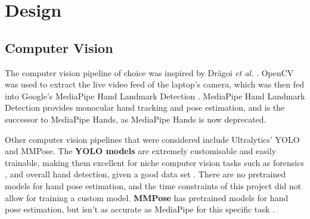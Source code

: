 





\chapter{Design}

\section{Computer Vision}
The computer vision pipeline of choice was inspired by Drăgoi \textit{et al.} \cite{bib:teleoperation_intuitive_using_MediaPipeHands}. OpenCV was used to extract the live video feed of the laptop's camera, which was then fed into Google's MediaPipe Hand Landmark Detection \cite{bib:MediaPipe_Hand_landmarks_detecion}. MediaPipe Hand Landmark Detection provides monocular hand tracking and pose estimation, and is the successor to MediaPipe Hands, as MediaPipe Hands is now deprecated.

Other computer vision pipelines that were considered include Ultralytics' YOLO \cite{bib:Ultralytics_YOLO} and MMPose. The \textbf{YOLO models} are extremely customisable and easily trainable, making them excellent for niche computer vision tasks such as forensics \cite{bib:YOLO_in_forensics}, and overall hand detection, given a good data set \cite{bib:YOLO_in_complex_background}. There are no pretrained models for hand pose estimation, and the time constraints of this project did not allow for training a custom model. \textbf{MMPose} has pretrained models for hand pose estimation, but isn't as accurate as MediaPipe for this specific task \cite{bib:MMPose_versus_MediaPipe}.

